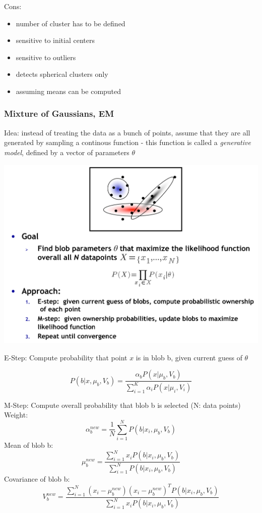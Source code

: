 Cons:
\begin{itemize}
	\item number of cluster has to be defined
	\item sensitive to initial centers
	\item sensitive to outliers
	\item detects spherical clusters only
	\item assuming means can be computed
\end{itemize}
\subsubsection{Mixture of Gaussians, EM}
Idea: instead of treating the data as a bunch of points, assume that they are all generated by sampling a continous function - this function is called a \textit{generative model}, defined by a vector of parameters $\theta$

\includegraphics[width=\columnwidth]{pictures/EM}

E-Step: Compute probability that point $x$ is in blob b, given current guess of $\theta$

$$ P(b|x,\mu_b, V_b) = \frac{\alpha_b P(x|\mu_b, V_b)}{\sum_{i=1}^{K}\alpha_i P(x|\mu_i, V_i)} $$

M-Step: Compute overall probability that blob b is selected (N: data points)\\

Weight:
$$\alpha_b^{new} = \frac{1}{N} \sum_{i=1}^{N} P(b|x_i, \mu_b, V_b) $$
Mean of blob b:
$$ \mu_b^{new} = \frac{\sum_{i=1}^{N} x_i P(b|x_i, \mu_b, V_b)}{\sum_{i=1}^{N} P(b|x_i, \mu_b, V_b)}$$
Covariance of blob b:
$$ V_b^{new} = \frac{\sum_{i=1}^{N} (x_i-\mu_b^{new})(x_i-\mu_b^{new})^T P(b|x_i, \mu_b, V_b)}{\sum_{i=1}^{N} x_i P(b|x_i, \mu_b, V_b)} $$

